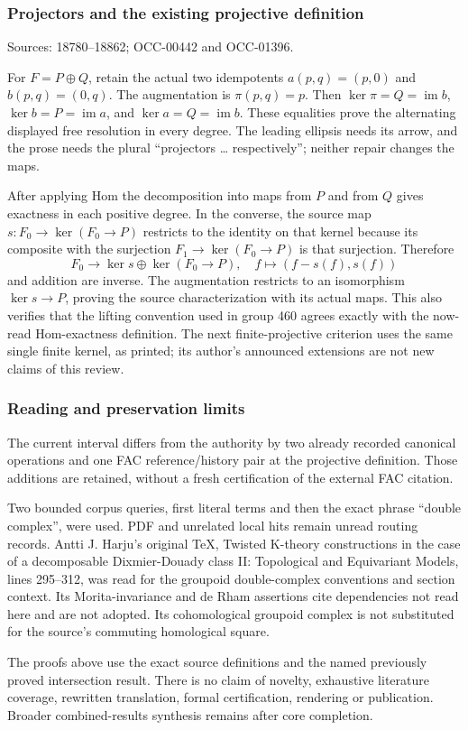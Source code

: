 \subsubsection{Projectors and the existing projective definition}\label{projectors-and-the-existing-projective-definition}

Sources: 18780--18862; OCC-00442 and OCC-01396.

For \(F=P\oplus Q\), retain the actual two idempotents \(a(p,q)=(p,0)\) and \(b(p,q)=(0,q)\). The augmentation is \(\pi(p,q)=p\). Then \(\ker\pi=Q=\operatorname{im}b\), \(\ker b=P=\operatorname{im}a\), and \(\ker a=Q=\operatorname{im}b\). These equalities prove the alternating displayed free resolution in every degree. The leading ellipsis needs its arrow, and the prose needs the plural ``projectors \ldots{} respectively''; neither repair changes the maps.

After applying Hom the decomposition into maps from \(P\) and from \(Q\) gives exactness in each positive degree. In the converse, the source map \(s:F_0\to\ker(F_0\to P)\) restricts to the identity on that kernel because its composite with the surjection \(F_1\to\ker(F_0\to P)\) is that surjection. Therefore \[
F_0\longrightarrow\ker s\oplus\ker(F_0\to P),\quad
f\longmapsto(f-s(f),s(f))
\] and addition are inverse. The augmentation restricts to an isomorphism \(\ker s\to P\), proving the source characterization with its actual maps. This also verifies that the lifting convention used in group 460 agrees exactly with the now-read Hom-exactness definition. The next finite-projective criterion uses the same single finite kernel, as printed; its author's announced extensions are not new claims of this review.

\subsubsection{Reading and preservation limits}\label{reading-and-preservation-limits}

The current interval differs from the authority by two already recorded canonical operations and one FAC reference/history pair at the projective definition. Those additions are retained, without a fresh certification of the external FAC citation.

Two bounded corpus queries, first literal terms and then the exact phrase ``double complex'', were used. PDF and unrelated local hits remain unread routing records. Antti J. Harju's original TeX, Twisted K-theory constructions in the case of a decomposable Dixmier-Douady class II: Topological and Equivariant Models, lines 295--312, was read for the groupoid double-complex conventions and section context. Its Morita-invariance and de Rham assertions cite dependencies not read here and are not adopted. Its cohomological groupoid complex is not substituted for the source's commuting homological square.

The proofs above use the exact source definitions and the named previously proved intersection result. There is no claim of novelty, exhaustive literature coverage, rewritten translation, formal certification, rendering or publication. Broader combined-results synthesis remains after core completion.
